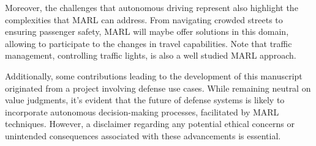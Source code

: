Moreover, the challenges that autonomous driving represent also highlight the complexities that MARL can address.
From navigating crowded streets to ensuring passenger safety, MARL will maybe offer solutions in this domain, allowing to participate to the changes in travel capabilities.
Note that traffic management, controlling traffic lights, is also a well studied MARL approach.

Additionally, some contributions leading to the development of this manuscript originated from a project involving defense use cases.
While remaining neutral on value judgments, it's evident that the future of defense systems is likely to incorporate autonomous decision-making processes, facilitated by MARL techniques. 
However, a disclaimer regarding any potential ethical concerns or unintended consequences associated with these advancements is essential.
